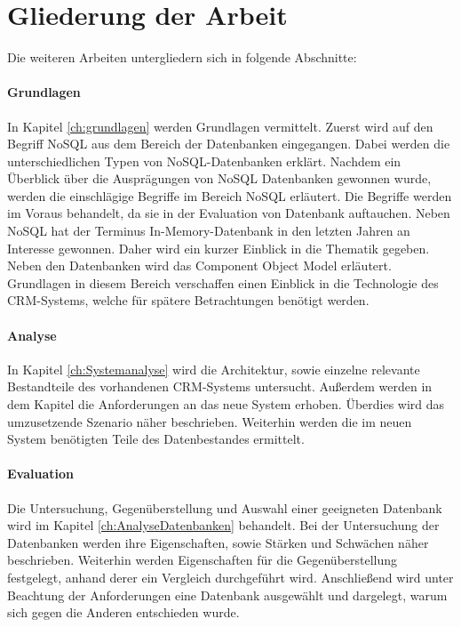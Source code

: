 \section{Gliederung der Arbeit}
\label{ch:Einfuehrung:sec:Gliederung}

Die weiteren Arbeiten untergliedern sich in folgende Abschnitte: 
 
\paragraph{Grundlagen} In Kapitel \ref{ch:grundlagen} werden Grundlagen vermittelt. Zuerst wird auf den Begriff NoSQL aus dem Bereich der Datenbanken eingegangen. Dabei werden die unterschiedlichen Typen von NoSQL-Datenbanken erklärt. Nachdem ein Überblick über die Ausprägungen von NoSQL Datenbanken gewonnen wurde, werden die einschlägige Begriffe im Bereich NoSQL erläutert. Die Begriffe werden im Voraus behandelt, da sie in der Evaluation von Datenbank auftauchen. Neben NoSQL hat der Terminus In-Memory-Datenbank in den letzten Jahren an Interesse gewonnen. Daher wird ein kurzer Einblick in die Thematik gegeben. Neben den Datenbanken wird das Component Object Model erläutert. Grundlagen in diesem Bereich verschaffen einen Einblick in die Technologie des CRM-Systems, welche für spätere Betrachtungen benötigt werden. 

\paragraph{Analyse} In Kapitel \ref{ch:Systemanalyse} wird die Architektur, sowie einzelne relevante Bestandteile des vorhandenen CRM-Systems untersucht. Außerdem werden in dem Kapitel die Anforderungen an das neue System erhoben. Überdies wird das umzusetzende Szenario näher beschrieben. Weiterhin werden die im neuen System benötigten Teile des Datenbestandes ermittelt. 

\paragraph{Evaluation} Die Untersuchung, Gegenüberstellung und Auswahl einer geeigneten Datenbank wird im Kapitel \ref{ch:AnalyseDatenbanken} behandelt. Bei der Untersuchung der Datenbanken werden ihre Eigenschaften, sowie Stärken und Schwächen näher beschrieben. Weiterhin werden Eigenschaften für die Gegenüberstellung festgelegt, anhand derer ein Vergleich durchgeführt wird. Anschließend wird unter Beachtung der Anforderungen eine Datenbank ausgewählt und dargelegt, warum sich gegen die Anderen entschieden wurde.  

